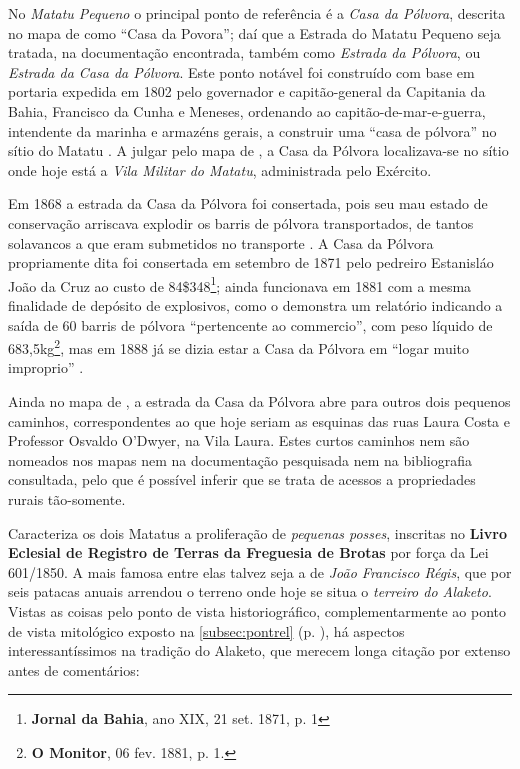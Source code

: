 No \textit{Matatu Pequeno} o principal ponto de referência é a \textit{Casa da Pólvora}, descrita no mapa de  como ``Casa da Povora''; daí que a Estrada do Matatu Pequeno seja tratada, na documentação encontrada, também como \textit{Estrada da Pólvora}, ou \textit{Estrada da Casa da Pólvora}. Este ponto notável foi construído com base em portaria expedida em 1802 pelo governador e capitão-general da Capitania da Bahia, Francisco da Cunha e Meneses, ordenando ao capitão-de-mar-e-guerra, intendente da marinha e armazéns gerais, a construir uma ``casa de pólvora'' no sítio do Matatu \cite[p.~93]{oliveira_ultramar_1977}. A julgar pelo mapa de , a Casa da Pólvora localizava-se no sítio onde hoje está a \textit{Vila Militar do Matatu}, administrada pelo Exército. 

Em 1868 a estrada da Casa da Pólvora foi consertada, pois seu mau estado de conservação arriscava explodir os barris de pólvora transportados, de tantos solavancos a que eram submetidos no transporte \cite[anexo~G,~p.~9]{bahia_anexosrelatorio_1868}. A Casa da Pólvora propriamente dita foi consertada em setembro de 1871 pelo pedreiro Estanisláo João da Cruz ao custo de 84\$348\footnote{\textbf{Jornal da Bahia}, ano XIX, 21 set. 1871, p. 1}; ainda funcionava em 1881 com a mesma finalidade de depósito de explosivos, como o demonstra um relatório indicando a saída de 60 barris de pólvora ``pertencente ao commercio'', com peso líquido de 683,5kg\footnote{\textbf{O Monitor}, 06 fev. 1881, p. 1.}, mas em 1888 já se dizia estar a Casa da Pólvora em ``logar muito improprio'' \cite[vol.~3,~p.~40]{bahia_relatorio_1888}. 

Ainda no mapa de , a estrada da Casa da Pólvora abre para outros dois pequenos caminhos, correspondentes ao que hoje seriam as esquinas das ruas Laura Costa e Professor Osvaldo O'Dwyer, na Vila Laura. Estes curtos caminhos nem são nomeados nos mapas nem na documentação pesquisada nem na bibliografia consultada, pelo que é possível inferir que se trata de acessos a propriedades rurais tão-somente.

Caracteriza os dois Matatus a proliferação de \textit{pequenas posses}, inscritas no \textbf{Livro Eclesial de Registro de Terras da Freguesia de Brotas} por força da Lei 601/1850. A mais famosa entre elas talvez seja a de \textit{João Francisco Régis}, que por seis patacas anuais arrendou o terreno onde hoje se situa o \textit{terreiro do Alaketo}. Vistas as coisas pelo ponto de vista historiográfico, complementarmente ao ponto de vista mitológico exposto na \autoref{subsec:pontrel} (p. \pageref{subsec:pontrel}), há aspectos interessantíssimos na tradição do Alaketo, que merecem longa citação por extenso antes de comentários:

